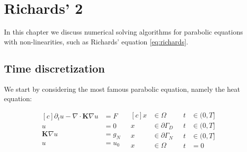 \documentclass[../Main/main.tex]{subfiles}
\begin{document}
	\graphicspath{{../Time dependent equations/figs/}}
	\chapter{Richards' 2}
	In this chapter we discuss numerical solving algorithms for parabolic equations with non-linearities, such as Richards' equation \eqref{eq:richards}. 
	\section*{Time discretization}
	We start by considering the most famous parabolic equation, namely the heat equation:
	
	\begin{equation}\label{eq:heat equation}
		\begin{aligned}[c]
			\partial_t u - \nabla \cdot \pmb{K} \nabla u &= F \\
			u &= 0 \\
			\pmb{K}\nabla u &= g_N\\
			u &= u_0
		\end{aligned}
		\ \ \
		\begin{aligned}[c]
			x &\in \Omega  \\
			x &\in \partial \Gamma_D \\
			x &\in \partial \Gamma_N \\
			x &\in \Omega  
		\end{aligned}
		\ \ \
		\begin{aligned}
			t&\in (0,T] \\
			t&\in (0,T] \\
			t&\in (0,T] \\
			t&=0
		\end{aligned}
	\end{equation}
	
\end{document}
